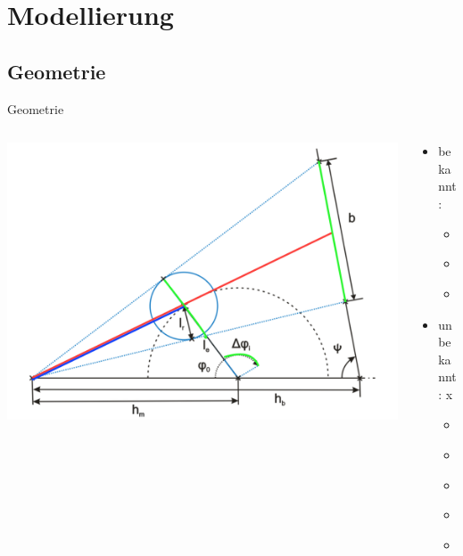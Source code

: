 \documentclass[compress]{beamer}
\begin{document}
\section{Modellierung}
\subsection{Geometrie}
\begin{frame}{Geometrie}
	\begin{columns}
		\begin{column}{0.68\linewidth}
			\centering
			\includegraphics[width=\linewidth]{images/raw.png}
		\end{column}
		\begin{column}{0.3\linewidth}
			\begin{itemize}
				\item bekannt:
				\begin{itemize}
					\item b
					\item $l_r$
					\item $\Delta \phi_i$
				\end{itemize}
				\item unbekannt: x
				\begin{itemize}
					\item $\phi_0$
					\item $l_e$
					\item $h_m$
					\item $h_b$
					\item $\psi$
				\end{itemize}
			\end{itemize}
		\end{column}
	\end{columns}
\end{frame}
\end{document}
